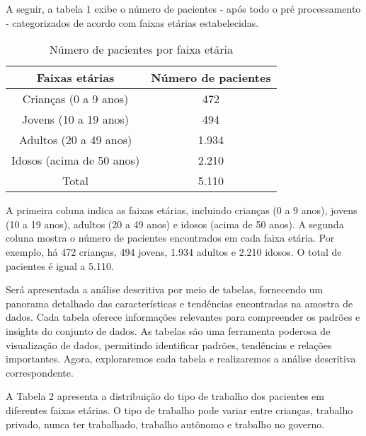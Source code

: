 \documentclass[conference]{IEEEtran}
\begin{document}
A seguir, a tabela 1 exibe o número de pacientes - após todo o pré processamento - categorizados de acordo com faixas etárias estabelecidas.



\begin{table}[h]
  \caption{Número de pacientes por faixa etária}
  \centering
  \label{tab:num_pacientes}
  \begin{tabular}{|c|c|}
  \hline
  \textbf{Faixas etárias}   & \textbf{Número de pacientes}  \\ \hline
  Crianças (0 a 9 anos)     & 472                           \\ \hline
  Jovens (10 a 19 anos)     & 494                           \\ \hline
  Adultos (20 a 49 anos)    & 1.934                         \\ \hline
  Idosos (acima de 50 anos) & 2.210                         \\ \hline
  Total                     & 5.110                         \\ \hline
  \end{tabular}
\end{table}

  \label{AA}
A primeira coluna indica as faixas etárias, incluindo crianças (0 a 9 anos), jovens (10 a 19 anos), adultos (20 a 49 anos) e idosos (acima de 50 anos). A segunda coluna mostra o número de pacientes encontrados em cada faixa etária. Por exemplo, há 472 crianças, 494 jovens, 1.934 adultos e 2.210 idosos. O total de pacientes é igual a 5.110. 

Será apresentada a análise descritiva por meio de tabelas, fornecendo um panorama detalhado das características e tendências encontradas na amostra de dados. Cada tabela oferece informações relevantes para compreender os padrões e insights do conjunto de dados. As tabelas são uma ferramenta poderosa de visualização de dados, permitindo identificar padrões, tendências e relações importantes. Agora, exploraremos cada tabela e realizaremos a análise descritiva correspondente.

A Tabela 2 apresenta a distribuição do tipo de trabalho dos pacientes em diferentes faixas etárias. O tipo de trabalho pode variar entre crianças, trabalho privado, nunca ter trabalhado, trabalho autônomo e trabalho no governo.  
\end{document}

